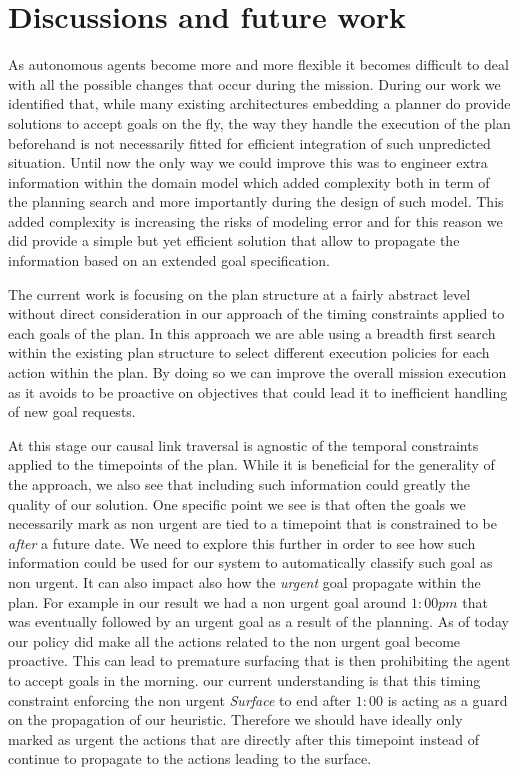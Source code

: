 \section{Discussions and future work}
\label{sec:conclude}

As autonomous agents become more and more flexible it becomes difficult
to deal with all the possible changes that occur during the
mission. During our work we identified that, while many existing 
architectures embedding a planner do provide solutions to accept goals
on the fly, the way they handle the execution of the plan beforehand
is not necessarily fitted for efficient integration of such unpredicted
situation. Until now the only way we could improve this was to engineer
extra information within the domain model which added complexity both in
term of the planning search and more importantly during the design of
such model. This added complexity is increasing the risks of modeling
error and for this reason we did provide a simple but yet efficient
solution that allow to propagate the information based on an extended
goal specification. 


The current work is focusing on the plan  structure at a fairly
abstract level without direct consideration in our approach of the
timing constraints applied to each goals of the plan. In this approach
we are able using a breadth first search within the existing plan
structure to select different execution policies for each action
within the plan. By doing so we can improve the overall mission 
execution as it avoids to be proactive on objectives that could lead it
to inefficient handling of new goal requests.

At this stage our causal link traversal is agnostic of the temporal 
constraints applied to the timepoints of the plan. While it is
beneficial for the generality of the approach, we also see that
including such information could greatly the quality of our solution. 
One specific point we see is that often the goals we necessarily mark
as non urgent are tied to a timepoint that is constrained to be {\em
  after} a future date. We need to explore this further in order to
see how such information could be used for our system to automatically
classify such goal as non urgent. It can also impact  also how the
{\em urgent} goal propagate within the plan. For example in our result
we had a non urgent goal around $1:00 pm$ that was eventually 
followed by an urgent goal as a result of the planning. As of today 
our policy did make all the actions related to the non urgent goal 
become proactive. This can lead to premature surfacing that is then 
prohibiting the agent to accept goals in the morning. our current
understanding is that this timing constraint enforcing the non
urgent {\em Surface} to end after $1:00$ is acting as a guard on the
propagation of our heuristic. Therefore we should have ideally only
marked as urgent the actions that are directly after this timepoint
instead of continue to propagate to the actions leading to the
surface. 

